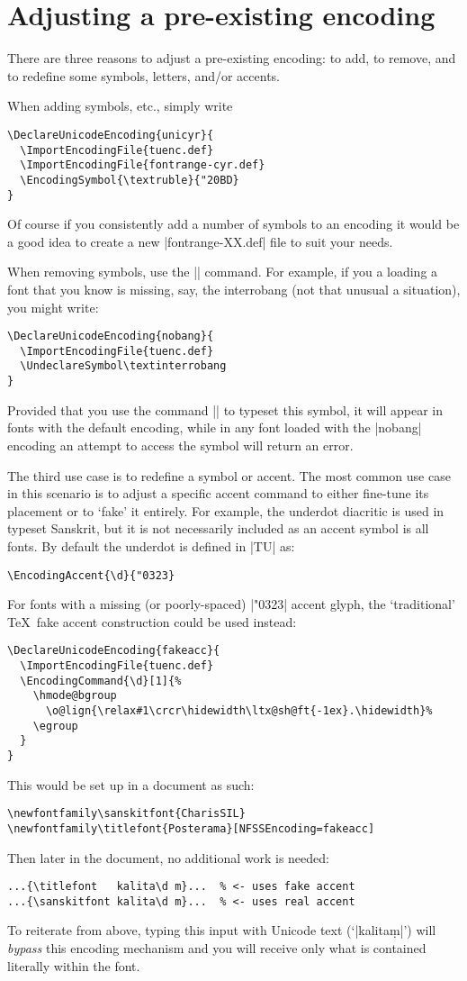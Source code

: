 \documentclass[a4paper]{ltxdoc}
\begin{document}
\section{Adjusting a pre-existing encoding}

There are three reasons to adjust a pre-existing encoding:
to add, to remove, and to redefine some symbols, letters, and/or accents.

When adding symbols, etc., simply write
\begin{Verbatim}
\DeclareUnicodeEncoding{unicyr}{
  \ImportEncodingFile{tuenc.def}
  \ImportEncodingFile{fontrange-cyr.def}
  \EncodingSymbol{\textruble}{"20BD}
}
\end{Verbatim}
Of course if you consistently add a number of symbols to an encoding it would be
a good idea to create a new |fontrange-XX.def| file to suit your needs.

When removing symbols, use the |\UndeclareSymbol| command.
For example, if you a loading a font that you know is missing, say, the interrobang
(not that unusual a situation), you might write:
\begin{Verbatim}
\DeclareUnicodeEncoding{nobang}{
  \ImportEncodingFile{tuenc.def}
  \UndeclareSymbol\textinterrobang
}
\end{Verbatim}
Provided that you use the command |\textinterrobang| to typeset this symbol,
it will appear in fonts with the default encoding, while in any font loaded with
the |nobang| encoding an attempt to access the symbol will return an error.


The third use case is to redefine a symbol or accent. The most common use case
in this scenario is to adjust a specific accent command to either fine-tune its placement
or to `fake' it entirely.
For example, the underdot diacritic is used in typeset Sanskrit,
but it is not necessarily included as an accent symbol is all fonts.
By default the underdot is defined in |TU| as:
\begin{Verbatim}
\EncodingAccent{\d}{"0323}
\end{Verbatim}
For fonts with a missing (or poorly-spaced) |"0323| accent glyph, the `traditional' \TeX\ fake accent
construction could be used instead:
\begin{Verbatim}
\DeclareUnicodeEncoding{fakeacc}{
  \ImportEncodingFile{tuenc.def}
  \EncodingCommand{\d}[1]{%
    \hmode@bgroup
      \o@lign{\relax#1\crcr\hidewidth\ltx@sh@ft{-1ex}.\hidewidth}%
    \egroup
  }
}
\end{Verbatim}
This would be set up in a document as such:
\begin{Verbatim}
\newfontfamily\sanskitfont{CharisSIL}
\newfontfamily\titlefont{Posterama}[NFSSEncoding=fakeacc]
\end{Verbatim}
Then later in the document, no additional work is needed:
\begin{Verbatim}
...{\titlefont   kalita\d m}...  % <- uses fake accent
...{\sanskitfont kalita\d m}...  % <- uses real accent
\end{Verbatim}
To reiterate from above, typing this input with Unicode text (`|kalitaṃ|')
will \emph{bypass} this encoding mechanism and you will receive only what is contained
literally within the font.
\end{document}
